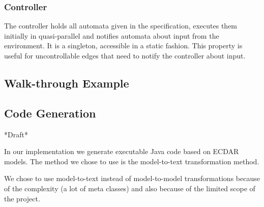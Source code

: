 \subsubsection{Controller}

The controller holds all automata given in the specification, executes
them initially in quasi-parallel and notifies automata about input
from the environment. It is a singleton, accessible in a static fashion.
This property is useful for uncontrollable edges that need to notify
the controller about input.


\subsection{Walk-through Example}



\subsection{Code Generation \label{implementation-code-generation}}

*Draft* 

In our implementation we generate executable Java code based on ECDAR models. The method we chose to use is the model-to-text transformation method.


We chose to use model-to-text instead of model-to-model transformations
because of the complexity (a lot of meta classes) and also because
of the limited scope of the project. %
